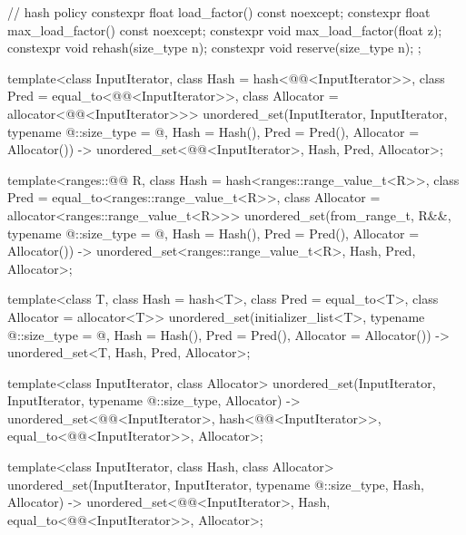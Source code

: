 \begin{codeblock}
{{    // hash policy
    constexpr float load_factor() const noexcept;
    constexpr float max_load_factor() const noexcept;
    constexpr void max_load_factor(float z);
    constexpr void rehash(size_type n);
    constexpr void reserve(size_type n);
  };

  template<class InputIterator,
           class Hash = hash<@@<InputIterator>>,
           class Pred = equal_to<@@<InputIterator>>,
           class Allocator = allocator<@@<InputIterator>>>
    unordered_set(InputIterator, InputIterator, typename @\seebelow@::size_type = @\seebelow@,
                  Hash = Hash(), Pred = Pred(), Allocator = Allocator())
      -> unordered_set<@@<InputIterator>,
                       Hash, Pred, Allocator>;

  template<ranges::@@ R,
           class Hash = hash<ranges::range_value_t<R>>,
           class Pred = equal_to<ranges::range_value_t<R>>,
           class Allocator = allocator<ranges::range_value_t<R>>>
    unordered_set(from_range_t, R&&, typename @\seebelow@::size_type = @\seebelow@,
                  Hash = Hash(), Pred = Pred(), Allocator = Allocator())
      -> unordered_set<ranges::range_value_t<R>, Hash, Pred, Allocator>;

  template<class T, class Hash = hash<T>,
           class Pred = equal_to<T>, class Allocator = allocator<T>>
    unordered_set(initializer_list<T>, typename @\seebelow@::size_type = @\seebelow@,
                  Hash = Hash(), Pred = Pred(), Allocator = Allocator())
      -> unordered_set<T, Hash, Pred, Allocator>;

  template<class InputIterator, class Allocator>
    unordered_set(InputIterator, InputIterator, typename @\seebelow@::size_type, Allocator)
      -> unordered_set<@@<InputIterator>,
                       hash<@@<InputIterator>>,
                       equal_to<@@<InputIterator>>,
                       Allocator>;

  template<class InputIterator, class Hash, class Allocator>
    unordered_set(InputIterator, InputIterator, typename @\seebelow@::size_type,
                  Hash, Allocator)
      -> unordered_set<@@<InputIterator>, Hash,
                       equal_to<@@<InputIterator>>,
                       Allocator>;

}
\end{codeblock}
